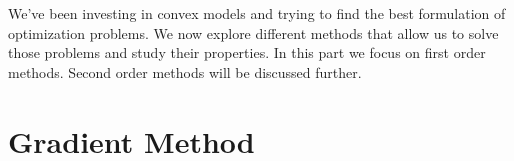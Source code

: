 %
%
%
%
%
% 


We've been investing in convex models and trying to find the best formulation of optimization problems. We now explore different methods that allow us to solve those problems and study their properties. In this part we focus on first order methods. Second order methods will be discussed further.

\section{Gradient Method}

